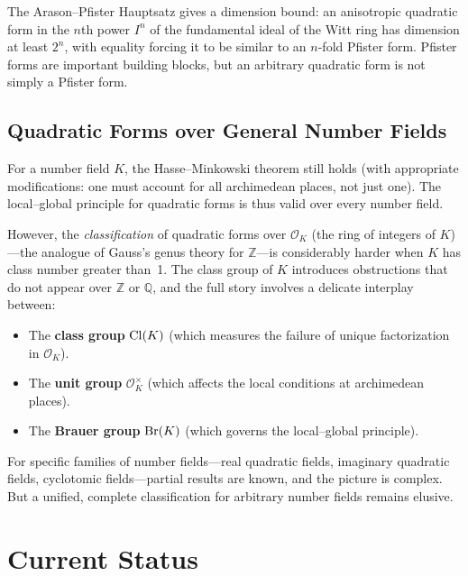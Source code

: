 The Arason--Pfister Hauptsatz gives a dimension bound: an anisotropic quadratic form in the $n$th power $I^n$ of the fundamental ideal of the Witt ring has dimension at least $2^n$, with equality forcing it to be similar to an $n$-fold Pfister form. Pfister forms are important building blocks, but an arbitrary quadratic form is not simply a Pfister form.

\subsection{Quadratic Forms over General Number Fields}

For a number field $K$, the Hasse--Minkowski theorem still holds (with appropriate modifications: one must account for all archimedean places, not just one). The local--global principle for quadratic forms is thus valid over every number field.

However, the \emph{classification} of quadratic forms over $\mathcal{O}_K$ (the ring of integers of $K$)---the analogue of Gauss's genus theory for $\mathbb{Z}$---is considerably harder when $K$ has class number greater than~1. The class group of $K$ introduces obstructions that do not appear over $\mathbb{Z}$ or $\mathbb{Q}$, and the full story involves a delicate interplay between:
\begin{itemize}
    \item The \textbf{class group} $\operatorname{Cl}(K)$ (which measures the failure of unique factorization in $\mathcal{O}_K$).
    \item The \textbf{unit group} $\mathcal{O}_K^\times$ (which affects the local conditions at archimedean places).
    \item The \textbf{Brauer group} $\operatorname{Br}(K)$ (which governs the local--global principle).
\end{itemize}

For specific families of number fields---real quadratic fields, imaginary quadratic fields, cyclotomic fields---partial results are known, and the picture is complex. But a unified, complete classification for arbitrary number fields remains elusive.

\section{Current Status}

